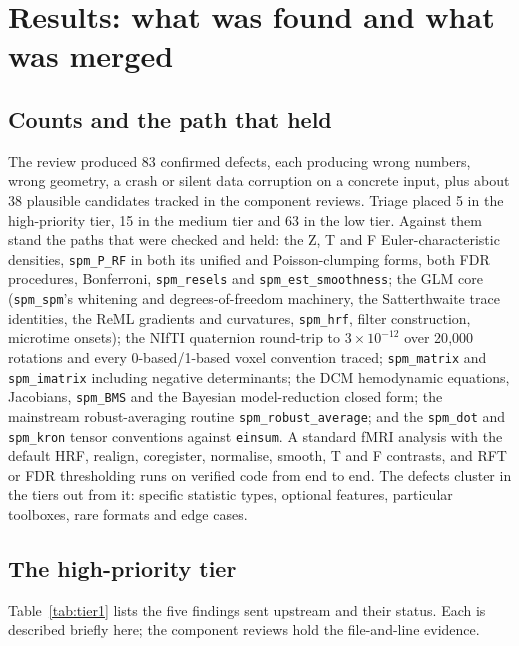 \documentclass[11pt]{article}
\newcommand{\code}[1]{\texttt{#1}}
\begin{document}
\section{Results: what was found and what was merged}
\label{sec:results}
\subsection{Counts and the path that held}
The review produced 83 confirmed defects, each producing wrong numbers, wrong geometry, a crash or silent data corruption on a concrete input, plus about 38 plausible candidates tracked in the component reviews. Triage placed 5 in the high-priority tier, 15 in the medium tier and 63 in the low tier. Against them stand the paths that were checked and held: the Z, T and F Euler-characteristic densities, \code{spm\_P\_RF} in both its unified and Poisson-clumping forms, both FDR procedures, Bonferroni, \code{spm\_resels} and \code{spm\_est\_smoothness}; the GLM core (\code{spm\_spm}'s whitening and degrees-of-freedom machinery, the Satterthwaite trace identities, the ReML gradients and curvatures, \code{spm\_hrf}, filter construction, microtime onsets); the NIfTI quaternion round-trip to $3\times10^{-12}$ over 20{,}000 rotations and every 0-based/1-based voxel convention traced; \code{spm\_matrix} and \code{spm\_imatrix} including negative determinants; the DCM hemodynamic equations, Jacobians, \code{spm\_BMS} and the Bayesian model-reduction closed form; the mainstream robust-averaging routine \code{spm\_robust\_average}; and the \code{spm\_dot} and \code{spm\_kron} tensor conventions against \code{einsum}. A standard fMRI analysis with the default HRF, realign, coregister, normalise, smooth, T and F contrasts, and RFT or FDR thresholding runs on verified code from end to end. The defects cluster in the tiers out from it: specific statistic types, optional features, particular toolboxes, rare formats and edge cases.

\subsection{The high-priority tier}
Table~\ref{tab:tier1} lists the five findings sent upstream and their status. Each is described briefly here; the component reviews hold the file-and-line evidence.
\end{document}
